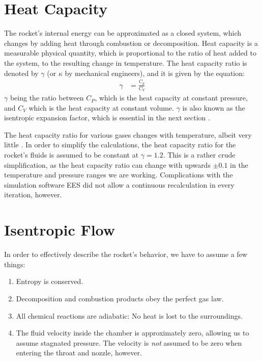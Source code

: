\section{Heat Capacity}

	The rocket's internal energy can be approximated as a closed system, which changes by adding heat through combustion or decomposition. Heat capacity is a measurable physical quantity, which is proportional to the ratio of heat added to the system, to the resulting change in temperature. The heat capacity ratio is denoted by $\gamma$ (or $\kappa$ by mechanical engineers), and it is given by the equation:
	 \begin{align}
		 \gamma &= \frac{C_p}{C_V}
	 \end{align}
	$\gamma$ being the ratio between $C_P$, which is the heat capacity at constant pressure, and $C_V$ which is the heat capacity at constant volume. $\gamma$ is also known as the isentropic expansion factor, which is essential in the next section \cite{IntroFluidRobert}.

	The heat capacity ratio for various gases changes with temperature, albeit very little \cite{FluidFrank}. In order to simplify the calculations, the heat capacity ratio for the rocket's fluids is assumed to be constant at $\gamma = 1.2$. This is a rather crude simplification, as the heat capacity ratio can change with upwards $\pm 0.1$ in the temperature and pressure ranges we are working. Complications with the simulation software EES did not allow a continuous recalculation in every iteration, however.

\section{Isentropic Flow}

	In order to effectively describe the rocket's behavior, we have to assume a few things:
	\begin{enumerate}[topsep=0pt,itemsep=-1ex,partopsep=1ex,parsep=1ex]
		\item{Entropy is conserved.}
		\item{Decomposition and combustion products obey the perfect gas law.}
		\item{All chemical reactions are adiabatic: No heat is lost to the surroundings.}
		\item{The fluid velocity inside the chamber is approximately zero, allowing us to assume stagnated pressure. The velocity is \emph{not} assumed to be zero when entering the throat and nozzle, however.}
	\end{enumerate}

